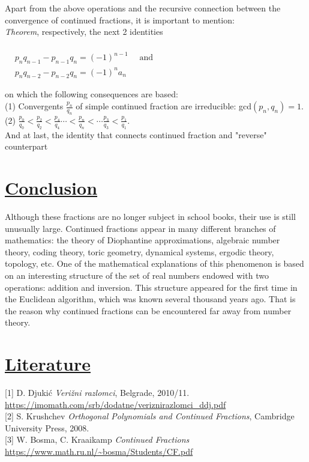 \documentclass{article}
\begin{document}
\begin{multicols}{2}
\begin{center}
\end{center}
Apart from the above operations and the recursive \text connection between the convergence of continued \text fractions, it is important to mention:\\
\textit{Theorem}, respectively, the next 2 identities\\[2mm]
\begin{center}
$\begin{aligned}\\[-13mm]
    &p_nq_{n-1}-p_{n-1}q_n=(-1)^{n-1} \quad\text{ and}\\
    &p_nq_{n-2}-p_{n-2}q_n=(-1)^na_n
\end{aligned}$\\[1.5mm]
\end{center}
on which the following consequences are based:\\[3mm]
(1) Convergents $\frac{p_n}{q_n}$ of simple continued fraction are irreducible: gcd$(p_n,q_n)=1$.\\[2mm]
(2)
$\displaystyle\frac{p_0}{q_0}<\frac{p_2}{q_2}<\frac{p_4}{q_4}\cdots<\frac{p_n}{q_n}<\cdots\frac{p_3}{q_3}<\frac{p_1}{q_1}.$\\[3mm]
And at last, the identity that connects continued \text fraction and "reverse" counterpart\\[1.5mm]

\section*{\underline{Conclusion}}
Although these fractions are no longer subject in school books, their use is still unusually large. Continued fractions appear in many different branches of mathematics: the theory of Diophantine approximations, \text algebraic number theory, coding theory, toric geometry, dynamical systems, ergodic theory, topology, etc. One of the mathematical explanations of this phenomenon is based on an interesting structure of the set of real numbers endowed with two operations: addition and inversion. This structure appeared for the ﬁrst time in the Euclidean algorithm, which was known several thousand years ago. That is the reason why \text continued \text fractions can be encountered far away from number \text theory.

\section*{\underline{Literature}}

[1] D. Djuki\'c \textit{Veri\v zni razlomci}, Belgrade, 2010/11. \url{https://imomath.com/srb/dodatne/veriznirazlomci_ddj.pdf}\\{}
[2] S. Krushchev \textit{Orthogonal Polynomials and Continued Fractions}, Cambridge University Press, 2008.\\{}
[3] W. Bosma, C. Kraaikamp \textit{Continued Fractions} \url{https://www.math.ru.nl/~bosma/Students/CF.pdf}

 \end{multicols}
  \pagebreak
\end{document}
